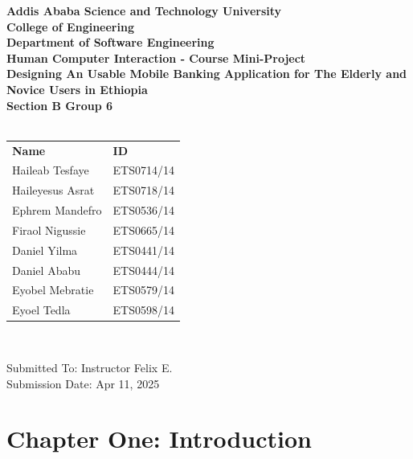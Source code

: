 \documentclass[a4paper,12pt]{report}
\begin{document}
\begin{titlepage}
  \centering
  {\large\bfseries Addis Ababa Science and Technology University} \\
  {\large\bfseries College of Engineering} \\
  {\large\bf Department of Software Engineering} \\[5mm]
  {\Large\bf Human Computer Interaction - Course Mini-Project} \\[5mm]
  {\Huge\bfseries Designing An Usable Mobile Banking Application for The Elderly and Novice Users in Ethiopia} \\ [2cm]
  {\Large\bfseries Section B Group 6 } \\[2mm]
  {\Large\bfseries{}} \\ [5mm]
  \begin{tabular}{ll}
    \large\textbf{Name}     & \large\textbf{ID} \\
    \large Haileab Tesfaye  & \large ETS0714/14 \\
    \large Haileyesus Asrat & \large ETS0718/14 \\
    \large Ephrem Mandefro  & \large ETS0536/14 \\
    \large Firaol Nigussie  & \large ETS0665/14 \\
    \large Daniel Yilma     & \large ETS0441/14 \\
    \large Daniel Ababu     & \large ETS0444/14 \\
    \large Eyobel Mebratie  & \large ETS0579/14 \\
    \large Eyoel Tedla      & \large ETS0598/14 \\
  \end{tabular} \\[4cm]

  \begin{flushright}
    {\large Submitted To: Instructor Felix E.}\\
    {\large Submission Date: Apr 11, 2025}
  \end{flushright}

\end{titlepage}
\tableofcontents
\chapter*{Chapter One: Introduction}
\setcounter{chapter}{1}
\setcounter{page}{1}
\end{document}
